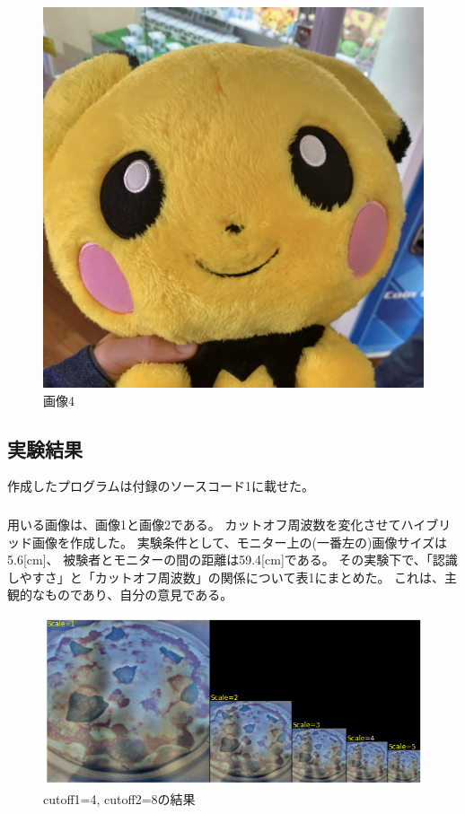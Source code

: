 \documentclass[12pt]{jarticle}
\begin{document}
\clearpage
\begin{figure}[h]
    \begin{center}
        \includegraphics[scale=0.1]{kadai4_3_4.jpg}
    \end{center}
    \caption{画像4}
\end{figure}

\subsection{実験結果}

作成したプログラムは付録のソースコード1に載せた。

\subsubsection{}
用いる画像は、画像1と画像2である。
カットオフ周波数を変化させてハイブリッド画像を作成した。
実験条件として、モニター上の(一番左の)画像サイズは5.6[cm]、
被験者とモニターの間の距離は59.4[cm]である。
その実験下で、「認識しやすさ」と「カットオフ周波数」の関係について表1にまとめた。
これは、主観的なものであり、自分の意見である。
\begin{figure}[h]
    \begin{center}
        \includegraphics[scale=0.7]{kadai4_3_5.png}
    \end{center}
    \caption{cutoff1=4, cutoff2=8の結果}
\end{figure}
\end{document}
